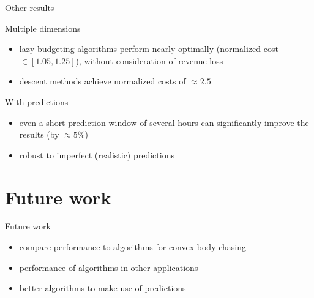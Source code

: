 \documentclass{beamer}
\begin{document}
\begin{frame}{Other results}
\begin{block}{Multiple dimensions}
\begin{itemize}
    \item lazy budgeting algorithms perform nearly optimally (normalized cost $\in [1.05, 1.25]$), without consideration of revenue loss\pause
    \item descent methods achieve normalized costs of $\approx 2.5$
\end{itemize}
\end{block}\pause
\begin{block}{With predictions}
\begin{itemize}
    \item even a short prediction window of several hours can significantly improve the results (by $\approx 5\%$)\pause
    \item robust to imperfect (realistic) predictions
\end{itemize}
\end{block}
\end{frame}


\section{Future work}

\begin{frame}{Future work}
\begin{itemize}
    \item compare performance to algorithms for convex body chasing\pause
    \item performance of algorithms in other applications\pause
    \item better algorithms to make use of predictions
\end{itemize}
\end{frame}
\end{document}
